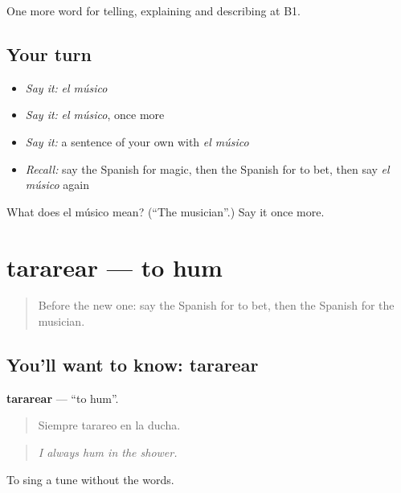 \begin{grammarlens}[title={What you've built}]
One more word for telling, explaining and describing at B1.
\end{grammarlens}

\subsection*{Your turn}
\begin{itemize}
\raggedright
  \item \emph{Say it:} \emph{el músico}
  \item \emph{Say it:} \emph{el músico}, once more
  \item \emph{Say it:} a sentence of your own with \emph{el músico}
  \item \emph{Recall:} say the Spanish for magic, then the Spanish for to bet, then say \emph{el músico} again
\end{itemize}

\begin{tcolorbox}[breakable,colback=teal!4,colframe=teal!35!black,title={Before you move on}]
What does el músico mean? (\textquotedblleft{}The musician\textquotedblright{}.) Say it once more.
\end{tcolorbox}
\section[tararear]{tararear — to hum}

\label{lesson:ES-C753-tararear}



\begin{quote}
Before the new one: say the Spanish for to bet, then the Spanish for the musician.
\end{quote}

\subsection*{You'll want to know: tararear}
\textbf{tararear} — \textquotedblleft{}to hum\textquotedblright{}.

\begin{quote}
Siempre tarareo en la ducha.
\end{quote}

\begin{quote}
\emph{I always hum in the shower.}
\end{quote}

To sing a tune without the words.


